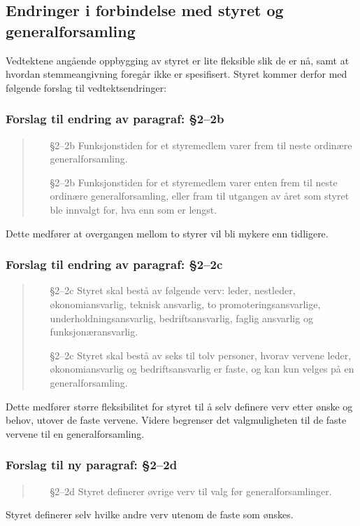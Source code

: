 \documentclass[10pt,norsk,a4paper]{article}
\begin{document}
\subsection{Endringer i forbindelse med styret og generalforsamling}
Vedtektene angående oppbygging av styret er lite fleksible slik de er nå, samt at hvordan stemmeangivning foregår ikke er spesifisert. Styret kommer derfor med følgende forslag til vedtektsendringer:

\subsubsection{Forslag til endring av paragraf: §2--2b}
\begin{quote}
	\begin{enumerate}
		\item[§2--2b] Funksjonstiden for et styremedlem varer frem til neste ordinære generalforsamling.
		\item[§2--2b] Funksjonstiden for et styremedlem varer enten frem til neste ordinære generalforsamling, eller fram til utgangen av året som styret ble innvalgt for, hva enn som er lengst.
	\end{enumerate}
\end{quote}
Dette medfører at overgangen mellom to styrer vil bli mykere enn tidligere.

\subsubsection{Forslag til endring av paragraf: §2--2c}
\begin{quote}
	\begin{enumerate}
		\item[§2--2c] Styret skal bestå av følgende verv: leder, nestleder, økonomiansvarlig, teknisk ansvarlig, to promoteringsansvarlige, underholdningsansvarlig, bedriftsansvarlig, faglig ansvarlig og funksjonæransvarlig.
		\item[§2--2c] Styret skal bestå av seks til tolv personer, hvorav vervene leder, økonomiansvarlig og bedriftsansvarlig er faste, og kan kun velges på en generalforsamling.
	\end{enumerate}
\end{quote}
Dette medfører større fleksibilitet for styret til å selv definere verv etter ønske og behov, utover de faste vervene. Videre begrenser det valgmuligheten til de faste vervene til en generalforsamling.

\subsubsection{Forslag til ny paragraf: §2--2d}
\begin{quote}
	\begin{enumerate}
		\item[§2--2d] Styret definerer øvrige verv til valg før generalforsamlinger.
	\end{enumerate}
\end{quote}
Styret definerer selv hvilke andre verv utenom de faste som ønskes.
\end{document}
